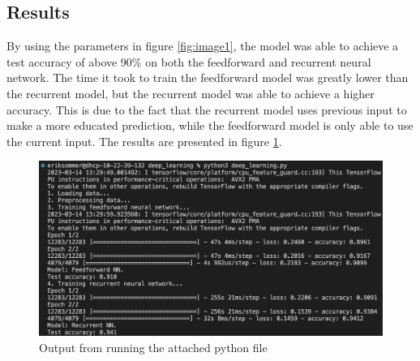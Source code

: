 \documentclass{article}
\begin{document}
\newpage

\subsection*{Results}

By using the parameters in figure \ref{fig:image1}, the model was able to achieve a test accuracy of above 90\% on both the feedforward and recurrent neural network.
The time it took to train the feedforward model was greatly lower than the recurrent model, but the recurrent model was able to achieve a higher accuracy.
This is due to the fact that the recurrent model uses previous input to make a more educated prediction, while the feedforward model is only able to use the current input.
The results are presented in figure \ref{fig:image2}.

\begin{figure}[hbtp]
    \centering
    \includegraphics[width=\linewidth]{images/output.png}
    \caption{Output from running the attached python file}
    \label{fig:image2}
\end{figure}
\end{document}
